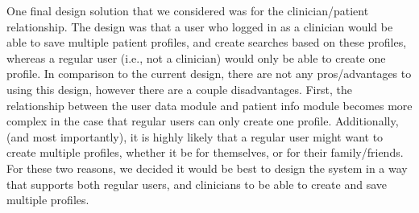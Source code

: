 \documentclass[12pt, titlepage]{article}
\begin{document}
\begin{enumerate}
  One final design solution that we considered was for the clinician/patient relationship. The design was that a user who logged in as 
  a clinician would be able to save multiple patient profiles, and create searches based on these profiles, whereas a regular user (i.e., not a 
  clinician) would only be able to create one profile. In comparison to the current design, there are not any pros/advantages to using this design, 
  however there are a couple disadvantages. First, the relationship between the user data module and patient info module becomes more complex 
  in the case that regular users can only create one profile. Additionally, (and most importantly), it is highly likely that a regular user might 
  want to create multiple profiles, whether it be for themselves, or for their family/friends. For these two reasons, we decided it would be 
  best to design the system in a way that supports both regular users, and clinicians to be able to create and save multiple profiles.
\end{enumerate}
\end{document}
